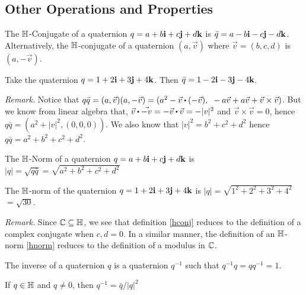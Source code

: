 \subsection{Other Operations and Properties}

\begin{definition}[$\HH$-Conjugate] \label{hconj}
	\emph{\cite{stamaria}}The $\HH$-Conjugate of a quaternion $q = a + b\textbf{i} + c\textbf{j} + d\textbf{k}$ is $\bar{q} = a - b\textbf{i} - c\textbf{j} - d\textbf{k}$. Alternatively, the $\HH$-conjugate of a quaternion $(a,\vec{v})$ where $\vec{v} = (b,c,d)$ is $(a,-\vec{v})$.
\end{definition}

\begin{ex}
	Take the quaternion $q = 1+2\textbf{i}+3\textbf{j}+4\textbf{k}$. Then $\bar{q} = 1-2\textbf{i}-3\textbf{j}-4\textbf{k}$.
\end{ex}

\textit{Remark.} Notice that $q\bar{q} = (a,\vec{v})(a,-\vec{v}) = (a^2-\vec{v}\bigcdot(-\vec{v}), \text{ } -a\vec{v}+a\vec{v}+\vec{v}\times\vec{v})$. But we know from linear algebra that, $\vec{v}\bigcdot\vec{-v} = -\vec{v}\bigcdot\vec{v} = -|v|^2$ and $\vec{v}\times\vec{v} = 0$, hence $q\bar{q} = (a^2+|v|^2,(0,0,0))$. We also know that $|v|^2 = b^2+c^2+d^2$ hence $q\bar{q} = a^2+b^2+c^2+d^2$.

\begin{definition}[$\HH$-Norm] \label{hnorm}
	\emph{\cite{stamaria}}The $\HH$-Norm of a quaternion $q = a + b\textbf{i} + c\textbf{j} + d\textbf{k}$ is $|q| = \sqrt{q\bar{q}} = \sqrt{a^2+b^2+c^2+d^2}$
\end{definition}

\begin{ex}
	The $\HH$-norm of the quaternion $q = 1 + 2\textbf{i} + 3\textbf{j} + 4\textbf{k}$ is $|q| = \sqrt{1^2 + 2^2 + 3^2 + 4^2}$ $ = \sqrt{30}$.
\end{ex}
	
	\textit{Remark.} Since $\operatorname{\mathbb{C}} \subseteq \operatorname{\mathbb{H}}$, we see that definition \ref{hconj} reduces to the definition of a complex conjugate when $c,d = 0$. In a similar manner, the definition of an $\HH$-norm \ref{hnorm} reduces to the definition of a modulus in $\operatorname{\mathbb{C}}$.

\begin{definition}[Inverse]
	\emph{\cite{lerios}}The inverse of a quaternion $q$ is a quaternion $q^{-1}$ such that $q^{-1}q = qq^{-1} = 1$.
\end{definition}

\begin{theorem} \label{quatinv}
	\emph{\cite{lerios}}If $q \in \operatorname{\mathbb{H}}$ and $q\neq 0$, then $q^{-1} = \bar{q}/|q|^2$
\end{theorem}

